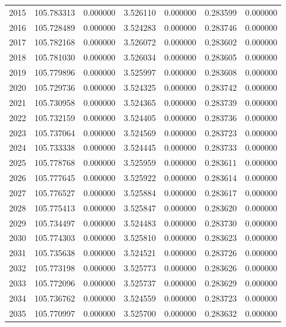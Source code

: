 \begin{tabular}{rrrrrrr}
2015 & 105.783313 &    0.000000 &  3.526110 &    0.000000 &    0.283599 &  0.000000 \\
2016 & 105.728489 &    0.000000 &  3.524283 &    0.000000 &    0.283746 &  0.000000 \\
2017 & 105.782168 &    0.000000 &  3.526072 &    0.000000 &    0.283602 &  0.000000 \\
2018 & 105.781030 &    0.000000 &  3.526034 &    0.000000 &    0.283605 &  0.000000 \\
2019 & 105.779896 &    0.000000 &  3.525997 &    0.000000 &    0.283608 &  0.000000 \\
2020 & 105.729736 &    0.000000 &  3.524325 &    0.000000 &    0.283742 &  0.000000 \\
2021 & 105.730958 &    0.000000 &  3.524365 &    0.000000 &    0.283739 &  0.000000 \\
2022 & 105.732159 &    0.000000 &  3.524405 &    0.000000 &    0.283736 &  0.000000 \\
2023 & 105.737064 &    0.000000 &  3.524569 &    0.000000 &    0.283723 &  0.000000 \\
2024 & 105.733338 &    0.000000 &  3.524445 &    0.000000 &    0.283733 &  0.000000 \\
2025 & 105.778768 &    0.000000 &  3.525959 &    0.000000 &    0.283611 &  0.000000 \\
2026 & 105.777645 &    0.000000 &  3.525922 &    0.000000 &    0.283614 &  0.000000 \\
2027 & 105.776527 &    0.000000 &  3.525884 &    0.000000 &    0.283617 &  0.000000 \\
2028 & 105.775413 &    0.000000 &  3.525847 &    0.000000 &    0.283620 &  0.000000 \\
2029 & 105.734497 &    0.000000 &  3.524483 &    0.000000 &    0.283730 &  0.000000 \\
2030 & 105.774303 &    0.000000 &  3.525810 &    0.000000 &    0.283623 &  0.000000 \\
2031 & 105.735638 &    0.000000 &  3.524521 &    0.000000 &    0.283726 &  0.000000 \\
2032 & 105.773198 &    0.000000 &  3.525773 &    0.000000 &    0.283626 &  0.000000 \\
2033 & 105.772096 &    0.000000 &  3.525737 &    0.000000 &    0.283629 &  0.000000 \\
2034 & 105.736762 &    0.000000 &  3.524559 &    0.000000 &    0.283723 &  0.000000 \\
2035 & 105.770997 &    0.000000 &  3.525700 &    0.000000 &    0.283632 &  0.000000 \\

\end{tabular}
